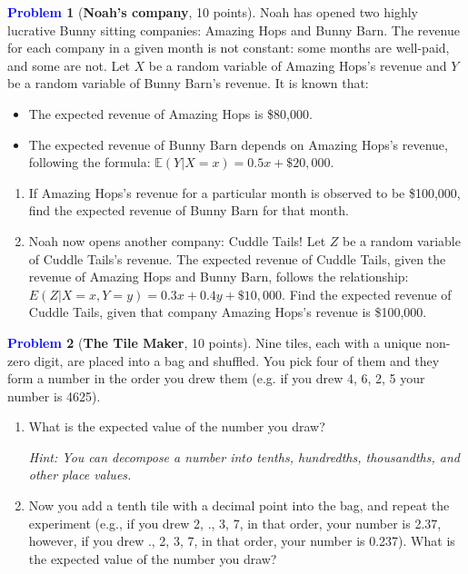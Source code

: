 \documentclass[letterpaper,11pt]{article}
\theoremstyle{plain}
\theoremstyle{definition}
\newtheorem{problem}{\textcolor{blue}{Problem}}
\newcommand{\E}{\mathbb{E}}
\theoremstyle{plain}
\begin{document}
\begin{problem}[\textbf{Noah's company}, 10 points]
    Noah has opened two highly lucrative Bunny sitting companies: Amazing Hops and Bunny Barn. The revenue for each company in a given month is not constant: some months are well-paid, and some are not. Let $X$ be a random variable of Amazing Hops's revenue and $Y$ be a random variable of Bunny Barn's revenue. 
    It is known that:
    \begin{itemize}
        \item The expected revenue of Amazing Hops is \$80,000.
        \item The expected revenue of Bunny Barn depends on Amazing Hops's revenue, following the formula: $\E(Y|X=x) = 0.5x + \$20,000$.
    \end{itemize}
    \begin{enumerate}[label=(\alph*)]
        \item If Amazing Hops's revenue for a particular month is observed to be \$100,000, find the expected revenue of Bunny Barn for that month.
        \item Noah now opens another company: Cuddle Tails! Let $Z$ be a random variable of Cuddle Tails's revenue. The expected revenue of Cuddle Tails, given the revenue of Amazing Hops and Bunny Barn, follows the relationship: $E(Z|X=x, Y=y) = 0.3x+0.4y+\$10,000$. Find the expected revenue of Cuddle Tails, given that company Amazing Hops's revenue is \$100,000.
    \end{enumerate}    
\end{problem}

\begin{problem}[\textbf{The Tile Maker}, 10 points]

Nine tiles, each with a unique non-zero digit, are placed into a bag and shuffled. You pick four of them and they form a number in the order you drew them (e.g. if you drew 4, 6, 2, 5 your number is 4625).

\begin{enumerate}[label=(\alph*), resume]


\item What is the expected value of the number you draw?

{\em Hint: You can decompose a number into tenths, hundredths, thousandths, and other place values.}


\item Now you add a tenth tile with a decimal point into the bag, and repeat the experiment (e.g., if you drew 2, ., 3, 7, in that order, your number is 2.37, however, if you drew ., 2, 3, 7, in that order, your number is 0.237).  What is the expected value of the number you draw?

\end{enumerate}
\end{problem}
\end{document}
